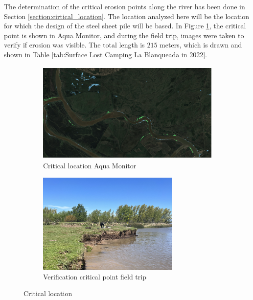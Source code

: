 
The determination of the critical erosion points along the river has been done in Section \ref{section:cirtical_location}. The location analyzed here will be the location for which the design of the steel sheet pile will be based. In Figure \ref{fig:critical_location_google}, the critical point is shown in Aqua Monitor, and during the field trip, images were taken to verify if erosion was visible. The total length is $215$ meters, which is drawn and shown in Table \ref{tab:Surface Lost Camping La Blanqueada in 2022}.

\begin{figure}[H]
    \centering
    \begin{subfigure}[b]{0.45\textwidth}
        \includegraphics[width=\linewidth, height=5cm]{figures/ch8/critical_location_google.png}
        \caption{Critical location Aqua Monitor}
        \label{fig:critical_location_google}
    \end{subfigure}
    \hfill
    \begin{subfigure}[b]{0.45\textwidth}
        \includegraphics[width=\linewidth, height=5cm]{figures/ch8/critical_location.jpeg}
        \caption{Verification critical point field trip}
        \label{fig:critical_location_fieldtrip}
    \end{subfigure}
    \caption{Critical location}
    \label{fig:critical_location}
\end{figure}

